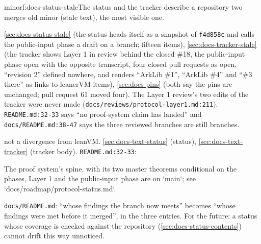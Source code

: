 \begin{finding}{minor}{f:docs-status-stale}{The status and the tracker describe a repository two merges old}
 minor (stale text), the most visible one.
 \begin{sloppypar}
\cref{sec:docs-status-stale} (the status heads itself as a snapshot of \texttt{f4d858c} and calls the public-input phase a draft on a branch; fifteen items), \cref{sec:docs-tracker-stale} (the tracker shows Layer 1 in review behind the closed \#18, the public-input phase open with the opposite transcript, four closed pull requests as open, ``revision 2'' defined nowhere, and renders ``ArkLib \#1'', ``ArkLib \#4'' and ``\#3 there'' as links to leanerVM items), \cref{sec:docs-pins} (both say the pins are unchanged; pull request 61 moved four). The Layer 1 review's two edits of the tracker were never made (\texttt{docs/\allowbreak{}reviews/\allowbreak{}protocol-\allowbreak{}layer1.\allowbreak{}md:\allowbreak{}211}). \texttt{README.\allowbreak{}md:\allowbreak{}32-\allowbreak{}33} says ``no proof-system claim has landed'' and \texttt{docs/\allowbreak{}README.\allowbreak{}md:\allowbreak{}38-\allowbreak{}47} says the three reviewed branches are still branches.
\end{sloppypar}
 not a divergence from leanVM.
 \cref{sec:docs-text-status} (status), \cref{sec:docs-text-tracker} (tracker body). \texttt{README.\allowbreak{}md:\allowbreak{}32-\allowbreak{}33}:

\begin{srccode}
The proof system's spine, with its two master theorems conditional on the phases, Layer 1 and the public-input phase are on `main`; see `docs/roadmap/protocol-status.md`.
\end{srccode}

\begin{sloppypar}
\texttt{docs/\allowbreak{}README.\allowbreak{}md}: ``whose findings the branch now meets'' becomes ``whose findings were met before it merged'', in the three entries. For the future: a status whose coverage is checked against the repository (\cref{sec:docs-status-contents}) cannot drift this way unnoticed.
\end{sloppypar}
\end{finding}

